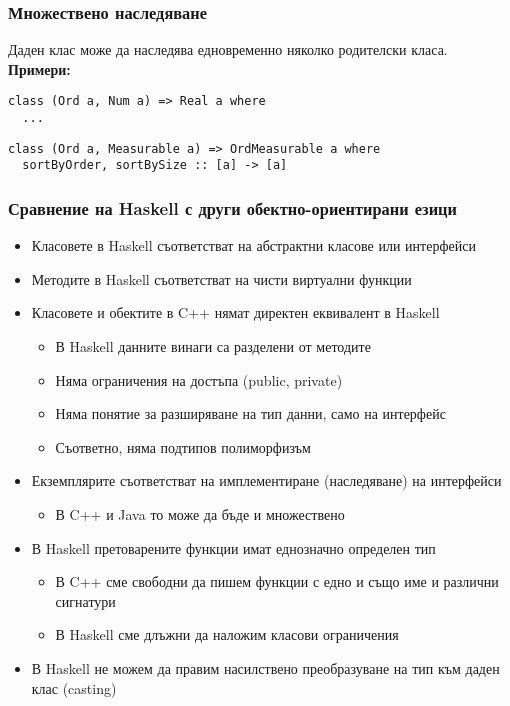 \documentclass[alsotrans]{beamerswitch}
\begin{document}
\begin{frame}[fragile]
  \frametitle{Множествено наследяване}
  Даден клас може да наследява едновременно няколко родителски класа.\\[1em]
  \textbf{Примери:}
\begin{lstlisting}
class (Ord a, Num a) => Real a where
  ...
\end{lstlisting}
\pause
\begin{lstlisting}
class (Ord a, Measurable a) => OrdMeasurable a where
  sortByOrder, sortBySize :: [a] -> [a]
\end{lstlisting}
\end{frame}

\begin{frame}
  \frametitle{Сравнение на Haskell с други обектно-ориентирани езици}
  \begin{itemize}[<+->]
  \item Класовете в Haskell съответстват на \alert{абстрактни класове или интерфейси}
  \item Методите в Haskell съответстват на \alert{чисти виртуални функции}
  \item Класовете и обектите в C++ \alert{нямат директен еквивалент в Haskell}
    \begin{itemize}
    \item В Haskell данните винаги са разделени от методите
    \item Няма ограничения на достъпа (public, private)
    \item Няма понятие за разширяване на тип данни, само на интерфейс
    \item Съответно, няма \alert{подтипов полиморфизъм}
    \end{itemize}
  \item Екземплярите съответстват на \alert{имплементиране (наследяване) на интерфейси}
    \begin{itemize}
    \item В C++ и Java то може да бъде и множествено
    \end{itemize}
  \item В Haskell претоварените функции имат \alert{еднозначно определен тип}
    \begin{itemize}
    \item В C++ сме свободни да пишем функции с едно и също име и различни сигнатури
    \item В Haskell сме длъжни да наложим класови ограничения
    \end{itemize}
  \item В Haskell не можем да правим насилствено преобразуване на тип към даден клас (casting)
  \end{itemize}
\end{frame}
\end{document}
